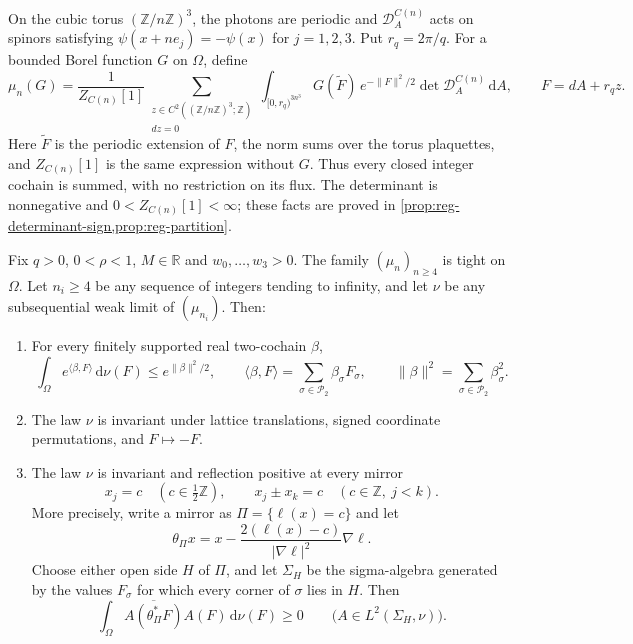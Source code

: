 \documentclass[11pt,letterpaper,reqno]{amsart}
\newcommand{\R}{\mathbb R}
\newcommand{\Z}{\mathbb Z}
\newcommand{\dd}{\mathrm d}
\begin{document}
On the cubic torus $(\Z/n\Z)^3$, the photons are periodic and
$\mathcal D_A^{C(n)}$ acts on spinors satisfying
$\psi(x+ne_j)=-\psi(x)$ for $j=1,2,3$. Put $r_q=2\pi/q$.
For a bounded Borel function $G$ on $\Omega$, define
\[
 \mu_n(G)=\frac1{Z_{C(n)}[1]}
 \sum_{\substack{z\in C^2((\Z/n\Z)^3;\Z)\\dz=0}}
 \int_{[0,r_q)^{3n^3}}
 G(\widetilde F)\,e^{-\|F\|^2/2}
       \det\mathcal D_A^{C(n)}\,\dd A,
 \qquad F=dA+r_qz.
\]
Here $\widetilde F$ is the periodic extension of $F$, the norm sums
over the torus plaquettes, and $Z_{C(n)}[1]$ is the same expression
without $G$. Thus every closed integer cochain is summed, with no
restriction on its flux. The determinant is nonnegative and
$0<Z_{C(n)}[1]<\infty$; these facts are proved in
\cref{prop:reg-determinant-sign,prop:reg-partition}.

\begin{theorem}\label{thm:main}\label{thm:cubic-limits}\label{thm:diag-lattice-limits}
Fix $q>0$, $0<\rho<1$, $M\in\R$ and $w_0,\ldots,w_3>0$.
The family $(\mu_n)_{n\ge4}$ is tight on $\Omega$. Let
$n_i\ge4$ be any sequence of integers tending to infinity, and let
$\nu$ be any subsequential weak limit of $(\mu_{n_i})$. Then:
\begin{enumerate}
\item[\textup{(i)}] For every finitely supported real two-cochain $\beta$,
\[
 \int_\Omega e^{\langle\beta,F\rangle}\,\dd\nu(F)
       \le e^{\|\beta\|^2/2},
 \qquad
 \langle\beta,F\rangle=\sum_{\sigma\in\mathcal P_2}\beta_\sigma F_\sigma,
 \qquad \|\beta\|^2=\sum_{\sigma\in\mathcal P_2}\beta_\sigma^2.
\]
\item[\textup{(ii)}] The law $\nu$ is invariant under lattice translations,
signed coordinate permutations, and $F\mapsto-F$.
\item[\textup{(iii)}] The law $\nu$ is invariant and reflection positive
at every mirror
\[
 x_j=c\quad(c\in\tfrac12\Z),\qquad
 x_j\pm x_k=c\quad(c\in\Z,\ j<k).
\]
More precisely, write a mirror as $\Pi=\{\ell(x)=c\}$ and let
\[
 \theta_\Pi x
 =x-\frac{2(\ell(x)-c)}{|\nabla\ell|^2}\nabla\ell.
\]
Choose either open side $H$ of $\Pi$, and let $\Sigma_H$ be the
sigma-algebra generated by the values $F_\sigma$ for which every
corner of $\sigma$ lies in $H$. Then
\[
 \int_\Omega\overline{A(\theta_\Pi^*F)}A(F)\,\dd\nu(F)\ge0
 \qquad\bigl(A\in L^2(\Sigma_H,\nu)\bigr).
\]
\end{enumerate}
\end{theorem}
\end{document}
